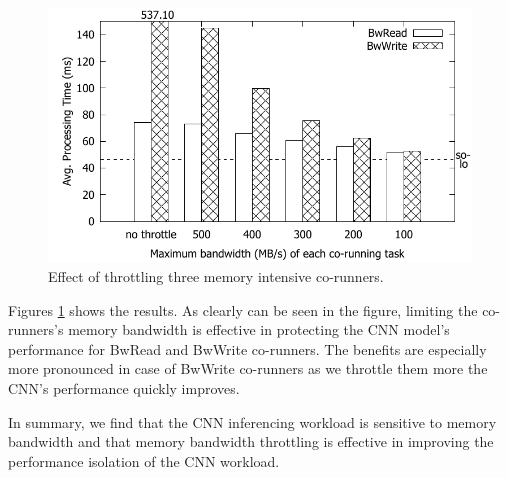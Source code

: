\begin{figure}[h]
  \centering
  \includegraphics[width=.45\textwidth]{figs/memguard_bandwidth}
  \caption{Effect of throttling three memory intensive co-runners.} 
  \label{fig:memguard_bandwidth}
\end{figure}

Figures \ref{fig:memguard_bandwidth} shows the results.
As clearly can be seen in the figure, limiting the co-runners's memory
bandwidth is effective in protecting the CNN model's performance for
BwRead and BwWrite co-runners. The benefits are especially more
pronounced in case of BwWrite co-runners as we throttle them more the
CNN's performance quickly improves.


In summary, we find that the CNN inferencing workload is sensitive to
memory bandwidth and that memory bandwidth throttling is effective in
improving the performance isolation of the CNN workload.





